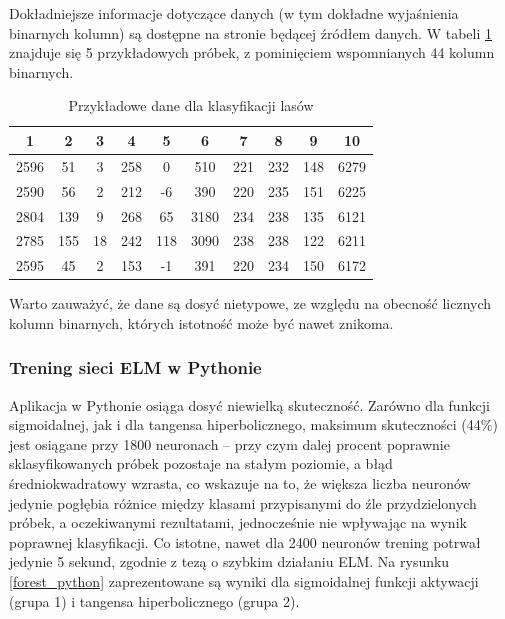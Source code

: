 \documentclass{article}
\begin{document}
Dokładniejsze informacje dotyczące danych (w tym dokładne wyjaśnienia binarnych kolumn) są dostępne na stronie będącej źródłem danych. W tabeli \ref{forest_first_5} znajduje się 5 przykładowych próbek, z pominięciem wspomnianych 44 kolumn binarnych.
\begin{table}[H]
\caption{Przykładowe dane dla klasyfikacji lasów}
\label{forest_first_5}
\centering
\begin{tabular}{|c|c|c|c|c|c|c|c|c|c|}
\hline
\textbf{1} & \textbf{2} & \textbf{3} & \textbf{4} & \textbf{5} & \textbf{6} & \textbf{7} & \textbf{8} & \textbf{9} & \textbf{10} \\
\hline
2596 & 51 & 3 & 258 & 0 & 510 & 221 & 232 & 148 & 6279 \\
2590 & 56 & 2 & 212 & -6 & 390 & 220 & 235 & 151 & 6225 \\
2804 & 139 & 9 & 268 & 65 & 3180 & 234 & 238 & 135 & 6121 \\
2785 & 155 & 18 & 242 & 118 & 3090 & 238 & 238 & 122 & 6211 \\
2595 & 45 & 2 & 153 & -1 & 391 & 220 & 234 & 150 & 6172 \\
\hline
\end{tabular}
\end{table}

Warto zauważyć, że dane są dosyć nietypowe, ze względu na obecność licznych kolumn binarnych, których istotność może być nawet znikoma.
\subsubsection{Trening sieci ELM w Pythonie}
Aplikacja w Pythonie osiąga dosyć niewielką skuteczność. Zarówno dla funkcji sigmoidalnej, jak i dla tangensa hiperbolicznego, maksimum skuteczności (44\%) jest osiągane przy 1800 neuronach -- przy czym dalej procent poprawnie sklasyfikowanych próbek pozostaje na stałym poziomie, a błąd średniokwadratowy wzrasta, co wskazuje na to, że większa liczba neuronów jedynie pogłębia różnice między klasami przypisanymi do źle przydzielonych próbek, a oczekiwanymi rezultatami, jednocześnie nie wpływając na wynik poprawnej klasyfikacji. Co istotne, nawet dla 2400 neuronów trening potrwał jedynie 5 sekund, zgodnie z tezą o szybkim działaniu ELM. 
Na rysunku \ref{forest_python} zaprezentowane są wyniki dla sigmoidalnej funkcji aktywacji (grupa 1) i tangensa hiperbolicznego (grupa 2). 
\end{document}

